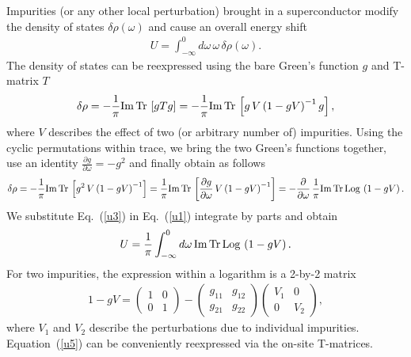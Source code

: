 \documentclass[twocolumn,showpacs,floatfix,longbibliography]{revtex4-1}
\begin{document}
\begin{widetext}
Impurities (or any other local perturbation) brought in a superconductor modify the density of states $\delta \rho(\omega)$ and cause an overall energy shift \cite{Yao2014}
\begin{align}
	U = \int_{-\infty}^0 d\omega\, \omega\,\delta\rho(\omega). \label{u1}
\end{align}
The density of states can be reexpressed using the bare Green's function $g$ and T-matrix $T$
\begin{align}
	\delta\rho = -\frac{1}{\pi}{\rm Im\,Tr\,}\left[ g T g \right] =  -\frac{1}{\pi}{\rm Im\,Tr\,}\left[ g\, V\left( 1-gV \right)^{-1} g \right],
\end{align}
where $V$ describes the effect of two (or arbitrary number of) impurities. Using the cyclic permutations within trace, we bring the two Green's functions together, use an identity $\frac{\partial g}{\partial\omega} = -g^2$ and finally obtain as follows
\begin{align}
	\delta\rho = -\frac{1}{\pi}{\rm Im\,Tr\,}\left[ g^2\, V\left( 1-gV \right)^{-1}  \right] =  \frac{1}{\pi}{\rm Im\,Tr\,}\left[ \frac{\partial g}{\partial\omega}\, V\left( 1-gV \right)^{-1}  \right] = -\frac{\partial}{\partial\omega}\, \frac{1}{\pi}{\rm Im\,Tr\,Log\,} \left( 1-gV \right). \label{u3}
\end{align}
We substitute Eq.~(\ref{u3}) in Eq.~(\ref{u1}) integrate by parts and obtain
\begin{align}
	U = \frac{1}{\pi}\int_{-\infty}^0 d\omega\, {\rm Im\,Tr\,Log\,} \left( 1-gV \right). \label{u4}
\end{align}
For two impurities, the expression within a logarithm is a 2-by-2 matrix
\begin{align}
	1-gV  =  \begin{pmatrix} 
		               1 & 0\\ 
			       0 & 1 
	         \end{pmatrix} - 
		 \begin{pmatrix} 
			g_{11} & g_{12} \\ 
			g_{21} & g_{22}  
	         \end{pmatrix} 
		 \begin{pmatrix}
			V_{1} &   0   \\ 
			0     &  V_{2}   
		\end{pmatrix},  \label{u5}
\end{align}
where $V_1$ and $V_2$ describe the perturbations due to individual impurities. Equation~(\ref{u5}) can be conveniently reexpressed via the on-site T-matrices.

\end{widetext}
\end{document}
